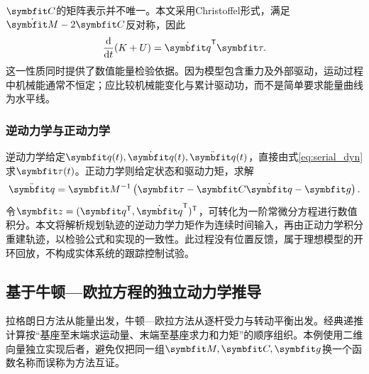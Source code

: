 $\vect C$的矩阵表示并不唯一。本文采用Christoffel形式，满足$\dot{\vect M}-2\vect C$反对称，因此
\begin{equation}
\frac{\dd}{\dd t}(K+U)=\dot{\vect q}^\T\vect\tau.
\label{eq:power_serial}
\end{equation}
这一性质同时提供了数值能量检验依据。因为模型包含重力及外部驱动，运动过程中机械能通常不恒定；应比较机械能变化与累计驱动功，而不是简单要求能量曲线为水平线。

\subsubsection{逆动力学与正动力学}

逆动力学给定$\vect q(t),\dot{\vect q}(t),\ddot{\vect q}(t)$，直接由式\eqref{eq:serial_dyn}求$\vect\tau(t)$。正动力学则给定状态和驱动力矩，求解
\begin{equation}
\ddot{\vect q}=\vect M^{-1}\left(\vect\tau-\vect C\dot{\vect q}-\vect g\right).
\end{equation}
令$\vect z=(\vect q^\T,\dot{\vect q}^\T)^\T$，可转化为一阶常微分方程进行数值积分。本文将解析规划轨迹的逆动力学力矩作为连续时间输入，再由正动力学积分重建轨迹，以检验公式和实现的一致性。此过程没有位置反馈，属于理想模型的开环回放，不构成实体系统的跟踪控制试验。

\subsection{基于牛顿—欧拉方程的独立动力学推导}
\label{sec:ne}

拉格朗日方法从能量出发，牛顿—欧拉方法从逐杆受力与转动平衡出发。经典递推计算按“基座至末端求运动量、末端至基座求力和力矩”的顺序组织\cite{luh1980,lynch2017}。本例使用二维向量独立实现后者，避免仅把同一组$\vect M,\vect C,\vect g$换一个函数名称而误称为方法互证。

